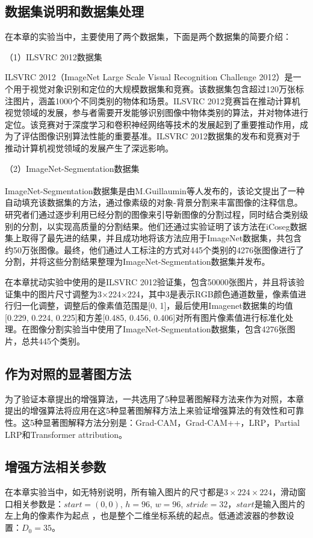 \subsection{数据集说明和数据集处理}
在本章的实验当中，主要使用了两个数据集，下面是两个数据集的简要介绍：

（1）ILSVRC 2012数据集

ILSVRC 2012（ImageNet Large Scale Visual Recognition Challenge 2012）是一个用于视觉对象识别和定位的大规模数据集和竞赛。该数据集包含超过120万张标注图片，涵盖1000个不同类别的物体和场景。ILSVRC 2012竞赛旨在推动计算机视觉领域的发展，参与者需要开发能够识别图像中物体类别的算法，并对物体进行定位。该竞赛对于深度学习和卷积神经网络等技术的发展起到了重要推动作用，成为了评估图像识别算法性能的重要基准。ILSVRC 2012数据集的发布和竞赛对于推动计算机视觉领域的发展产生了深远影响。

（2）ImageNet-Segmentation数据集

ImageNet-Segmentation数据集是由M.Guillaumin等人\textsuperscript{\cite{guillaumin2014imagenet}}发布的，该论文提出了一种自动填充该数据集的方法，通过像素级的对象-背景分割来丰富图像的注释信息。研究者们通过逐步利用已经分割的图像来引导新图像的分割过程，同时结合类别级别的分割，以实现高质量的分割结果。他们还通过实验证明了该方法在iCoseg数据集上取得了最先进的结果，并且成功地将该方法应用于ImageNet数据集，共包含约50万张图像。最终，他们通过人工标注的方式对445个类别的4276张图像进行了分割，并将这些分割结果整理为ImageNet-Segmentation数据集并发布。

在本章扰动实验中使用的是ILSVRC 2012验证集，包含50000张图片，并且将该验证集中的图片尺寸调整为3$\times$224$\times$224，其中$3$是表示RGB颜色通道数量，像素值进行归一化调整，调整后的像素值范围是[0, 1]，最后使用Imagenet数据集的均值[0.229, 0.224, 0.225]和方差[0.485, 0.456, 0.406]对所有图片像素值进行标准化处理。在图像分割实验当中使用了ImageNet-Segmentation数据集，包含4276张图片，总共445个类别。
\subsection{作为对照的显著图方法}
为了验证本章提出的增强算法，一共选用了5种显著图解释方法来作为对照，本章提出的增强算法将应用在这5种显著图解释方法上来验证增强算法的有效性和可靠性。这5种显著图解释方法分别是：Grad-CAM，Grad-CAM++，LRP，Partial LRP和Transformer attribution。


\subsection{增强方法相关参数}
在本章实验当中，如无特别说明，所有输入图片的尺寸都是$3\times224\times224$，滑动窗口相关参数是：$start=(0,0)$, $h=96$, $w=96$, $stride=32$，$start$是输入图片的左上角的像素作为起点 ，也是整个二维坐标系统的起点。低通滤波器的参数设置：$D_0=35$。



